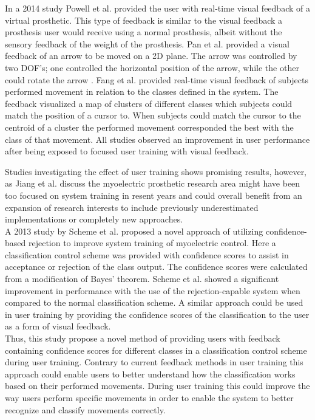 In a 2014 study Powell et al. \cite{Powell2014} provided the user with real-time visual feedback of a virtual prosthetic. This type of feedback is similar to the visual feedback a prosthesis user would receive using a normal prosthesis, albeit without the sensory feedback of the weight of the prosthesis. Pan et al. \cite{Pan2017} provided a visual feedback of an arrow to be moved on a 2D plane. The arrow was controlled by two DOF's; one controlled the horizontal position of the arrow, while the other could rotate the arrow \cite{Pan2017}. Fang et al. \cite{Fang2017} provided real-time visual feedback of subjects performed movement in relation to the classes defined in the system. The feedback visualized a map of clusters of different classes which subjects could match the position of a cursor to. When subjects could match the cursor to the centroid of a cluster the performed movement corresponded the best with the class of that movement. \cite{Fang2017} All studies observed an improvement in user performance after being exposed to focused user training with visual feedback. 

Studies investigating the effect of user training shows promising results, however, as Jiang et al. \cite{Jiang2012} discuss the myoelectric prosthetic research area might have been too focused on system training in resent years and could overall benefit from an expansion of research interests to include previously underestimated implementations or completely new approaches. \\
A 2013 study by Scheme et al. \cite{Scheme2013} proposed a novel approach of utilizing confidence-based rejection to improve system training of myoelectric control. Here a classification control scheme was provided with confidence scores to assist in acceptance or rejection of the class output. The confidence scores were calculated from a modification of Bayes' theorem. Scheme et al. \cite{Scheme2013} showed a significant improvement in performance with the use of the rejection-capable system when compared to the normal classification scheme. A similar approach could be used in user training by providing the confidence scores of the classification to the user as a form of visual feedback. \\
Thus, this study propose a novel method of providing users with feedback containing confidence scores for different classes in a classification control scheme during user training. Contrary to current feedback methods in user training this approach could enable users to better understand how the classification works based on their performed movements. During user training this could improve the way users perform specific movements in order to enable the system to better recognize and classify movements correctly.






